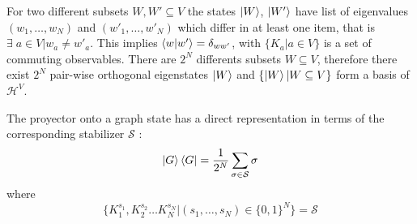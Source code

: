\documentclass[10pt,a4paper]{book}
\numberwithin{equation}{chapter}
\numberwithin{figure}{chapter}
\numberwithin{table}{chapter}
\begin{document}
For two different subsets $W,W' \subseteq V$ the states $\ket{W}$, $\ket{W'}$ have list of eigenvalues $(w_1,\ldots , w_N)$ and $(w'_1,\ldots , w'_N)$ which differ in at least one item, that is $\exists \; a \in V | w_{a}\neq w'_{a}$. This implies $\braket{w|w'}=\delta_{ww'}$, with $\lbrace K_{a}| a\in V\rbrace$ is a set of commuting observables. There are $2^N$ differents subsets $W \subseteq V$, therefore there exist $2^N$ pair-wise orthogonal eigenstates $\ket{W}$ and $\lbrace \ket{W}|W \subseteq V\rbrace$ form a basis of $\mathcal{H}^V$.

The proyector onto a graph state has a direct representation in terms of the corresponding stabilizer $\mathcal{S}$ :
\begin{equation}
\ket{G}\bra{G}=\frac{1}{2^N}\sum_{\sigma \in \mathcal{S}} \sigma
\label{eq:proyector}
\end{equation}
where
\begin{equation}
\lbrace K^{s_1}_{1},K^{s_2}_{2} \ldots K^{s_N}_{N} | (s_{1},\ldots, s_{N}) \in \lbrace 0,1\rbrace^{N} \rbrace = \mathcal{S}
\end{equation}
\end{document}
